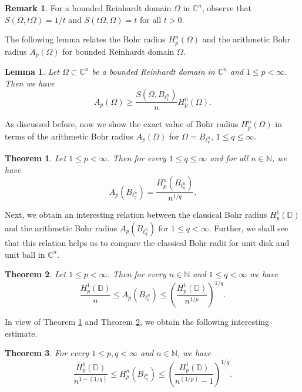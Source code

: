 \documentclass[a4paper,12pt]{amsart}
\newtheorem{thm}{Theorem}[section]
\newtheorem{lem}[equation]{Lemma}
\theoremstyle{definition}
\newtheorem{rem}{Remark}[section]
\begin{document}
\begin{rem}
	For a bounded Reinhardt domain $\Omega$ in $\mathbb{C}^n$, observe that $S(\Omega, t\Omega)=1/t$ and $S(t\Omega, \Omega)=t$  for all $t>0.$ 

\end{rem}
The following lemma relates the Bohr radius $H^n_{p}(\Omega)$ and the arithmetic Bohr radius $A_p(\Omega)$ for bounded Reinhardt domain $\Omega$.
\begin{lem}\label{Pal-Vasu-P4-lem-2.1}
	Let $\Omega \subset\mathbb{C}^n$ be a bounded Reinhardt domain in $\mathbb{C}^n$ and $1\leq p<\infty$. Then we have 
	\begin{equation*}
		A_p(\Omega) \geq \frac{S(\Omega, B_{\ell^n_1})}{n}H^n_{p}(\Omega).
	\end{equation*}
\end{lem}
As discussed before, now we show the exact value of Bohr radius $H^n_{p}(\Omega)$ in terms of the arithmetic Bohr radius $A_p(\Omega)$ for $\Omega=B_{\ell^n_{q}}$, $1\leq q\leq \infty$.
\begin{thm}\label{Pal-Vasu-P4-thm-2.2}
	Let $1\leq  p< \infty$. Then for every $1\leq q\leq \infty$ and for all $n\in \mathbb{N}$, we have 
	\begin{equation*}
		A_p(B_{\ell^n_q})= \frac{H^n_p(B_{\ell^n_q})}{n^{1/q}}.
	\end{equation*}
\end{thm}
Next, we obtain an interesting relation between the classical Bohr radius $H^1_{p}(\mathbb{D})$ and the arithmetic Bohr radius $A_p(B_{\ell^n_{q}})$ for $1\leq q<\infty$. Further, we shall see that this relation helps us to compare the classical Bohr radii for unit disk and unit ball in $\mathbb{C}^n$. 
\begin{thm}\label{Pal-Vasu-P4-thm-2.3}
Let $1\leq p<\infty$. Then for every $n\in \mathbb{N}$ and $1\leq q<\infty$ we have 
\begin{equation*}
	\frac{H^1_p(\mathbb{D})}{n}\leq A_p\left(B_{\ell^n_q}\right)\leq \left(\frac{H^1_p(\mathbb{D})}{n^{1/p}}\right)^{1/q}.
\end{equation*}
\end{thm}
In view of Theorem \ref{Pal-Vasu-P4-thm-2.2} and Theorem \ref{Pal-Vasu-P4-thm-2.3}, we obtain the following interesting estimate.
\begin{thm}\label{Pal-Vasu-P4-thm-2.4}
	For every $1\leq p,q <\infty$ and $n \in \mathbb{N}$, we have 
	\begin{equation*}
		\frac{H^1_{p}(\mathbb{D})}{n^{1-(1/q)}}\leq H^n_{p}(B_{\ell^n_{q}})\leq \left(\frac{H^1_{p}(\mathbb{D})}{n^{(1/p)}-1}\right)^{1/q}.
	\end{equation*}
\end{thm}
\end{document}
